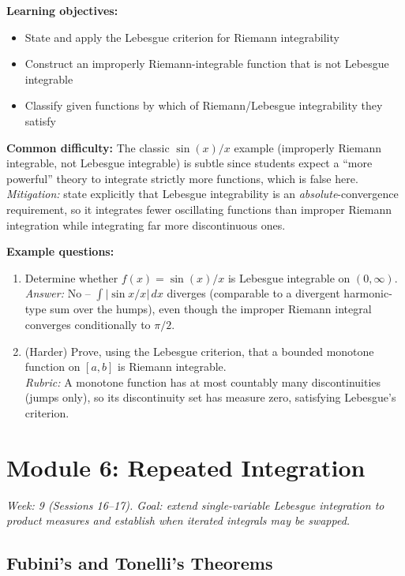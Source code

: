 \documentclass[11pt]{article}
\begin{document}
\textbf{Learning objectives:}
\begin{itemize}[nosep]
\item State and apply the Lebesgue criterion for Riemann integrability
\item Construct an improperly Riemann-integrable function that is not Lebesgue integrable
\item Classify given functions by which of Riemann/Lebesgue integrability they satisfy
\end{itemize}

\textbf{Common difficulty:} The classic $\sin(x)/x$ example (improperly Riemann integrable, not Lebesgue integrable) is subtle since students expect a ``more powerful'' theory to integrate strictly more functions, which is false here. \textit{Mitigation:} state explicitly that Lebesgue integrability is an \emph{absolute}-convergence requirement, so it integrates fewer oscillating functions than improper Riemann integration while integrating far more discontinuous ones.

\textbf{Example questions:}
\begin{enumerate}[nosep]
\item Determine whether $f(x)=\sin(x)/x$ is Lebesgue integrable on $(0,\infty)$. \\
\textit{Answer:} No -- $\int|\sin x/x|\,dx$ diverges (comparable to a divergent harmonic-type sum over the humps), even though the improper Riemann integral converges conditionally to $\pi/2$.
\item (Harder) Prove, using the Lebesgue criterion, that a bounded monotone function on $[a,b]$ is Riemann integrable. \\
\textit{Rubric:} A monotone function has at most countably many discontinuities (jumps only), so its discontinuity set has measure zero, satisfying Lebesgue's criterion.
\end{enumerate}

\section{Module 6: Repeated Integration}
\textit{Week: 9 (Sessions 16--17). Goal: extend single-variable Lebesgue integration to product measures and establish when iterated integrals may be swapped.}

\subsection{Fubini's and Tonelli's Theorems}
\end{document}

